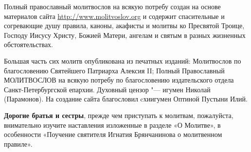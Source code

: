 \vspace*{0.2\paperheight}

\renewcommand\myid{announce}

\begin{identity}

Полный православный молитвослов на всякую потребу создан на основе материалов сайта \url{http://www.molitvoslov.org} и содержит спасительные и согревающие душу правила, каноны, акафисты и молитвы ко Пресвятой Троице, Господу Иисусу Христу, Божией Матери, ангелам и святым в разных жизненных обстоятельствах.

Большая часть сих молитв опубликована из печатных изданий: Молитвослов по благословению Святейшего Патриарха Алексия II; Полный Православный МОЛИТВОСЛОВ на всякую потребу по благословению издательского  отдела Санкт-Петербургской епархии. Духовный цензор "--- игумен Николай (Парамонов). На создание сайта благословил cхиигумен Оптиной Пустыни Илий.

\textbf{Дорогие братья и сестры}, прежде чем приступать к молитвам, пожалуйста, внимательно изучите наставления изложенные в разделе «О Молитве», в особенности «Поучение святителя Игнатия Брянчанинова о молитвенном правиле».

\end{identity}

